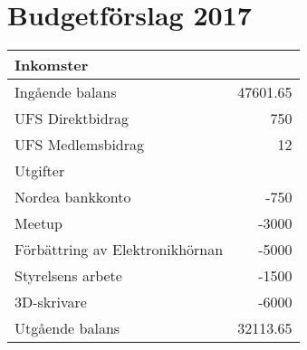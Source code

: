 \documentclass[a4paper,11pt,oneside]{article}
\begin{document}
\section{Budgetförslag 2017}

\begin{tabular}{lr}
  \toprule
  Inkomster & \\
  \midrule
  Ingående balans & 47601.65\\
  UFS Direktbidrag & 750\\
  UFS Medlemsbidrag & 12\\
  \midrule
  Utgifter & \\
  \midrule
  Nordea bankkonto & -750\\
  Meetup & -3000\\
  Förbättring av Elektronikhörnan & -5000\\
  Styrelsens arbete & -1500\\
  3D-skrivare & -6000\\
  \midrule
  Utgående balans & 32113.65\\
  \bottomrule
\end{tabular}
\end{document}
